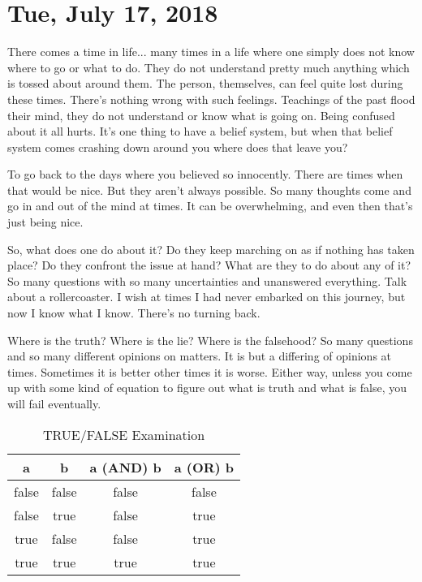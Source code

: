 \section{Tue, July 17, 2018}

There comes a time in life... many times in a life where one simply does not
know where to go or what to do. They do not understand pretty much anything
which is tossed about around them. The person, themselves, can feel quite lost
during these times. There's nothing wrong with such feelings. Teachings of the
past flood their mind, they do not understand or know what is going on. Being
confused about it all hurts. It's one thing to have a belief system, but when
that belief system comes crashing down around you where does that leave you?

To go back to the days where you believed so innocently. There are times when
that would be nice. But they aren't always possible. So many thoughts come and
go in and out of the mind at times. It can be overwhelming, and even then that's
just being nice.

So, what does one do about it? Do they keep marching on as if nothing has taken
place? Do they confront the issue at hand? What are they to do about any of it?
So many questions with so many uncertainties and unanswered everything. Talk
about a rollercoaster. I wish at times I had never embarked on this journey, but
now I know what I know. There's no turning back.

Where is the truth? Where is the lie? Where is the falsehood? So many questions
and so many different opinions on matters. It is but a differing of opinions at
times. Sometimes it is better other times it is worse. Either way, unless you
come up with some kind of equation to figure out what is truth and what is
false, you will fail eventually.


\begin{table}[h!]
\centering
\begin{tabular}{|c|c|c|c|}
\hline
a     & b     & a (AND) b      & a (OR) b    \\ \hline
false & false & false          & false       \\ \hline
false & true  & false          & true        \\ \hline
true  & false & false          & true        \\ \hline
true  & true  & true           & true        \\ \hline
\end{tabular}
\caption{TRUE/FALSE Examination}
\label{table:1}
\end{table}

